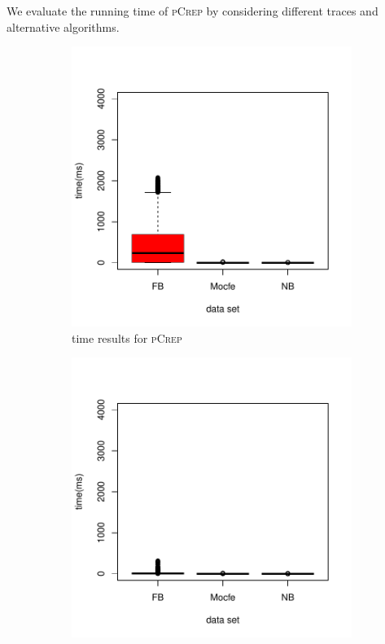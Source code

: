 \documentclass[a4paper,UKenglish,cleveref, autoref, thm-restate,authorcolumns]{lipics-v2019}
\newcommand{\adjDel}{\textsc{pCrep}}
\begin{document}
We evaluate the running time of \adjDel{} by considering different traces 
and alternative algorithms. 
	\begin{figure}[h]
		\centering
		\begin{minipage}{0.48\linewidth}
			\begin{subfigure}[b]{\linewidth}
				\includegraphics*[width=\linewidth]{plots/new_time_all_filtered_decompTree}
				\caption{time results for \adjDel}
			\end{subfigure}		
		\end{minipage}
		\begin{minipage}{0.48\linewidth}
			\begin{subfigure}[b]{\linewidth}
				\includegraphics*[width=\linewidth]{plots/new_time_all_filtered_compDecomp}

\end{subfigure}
\end{minipage}
\end{figure}
\end{document}
